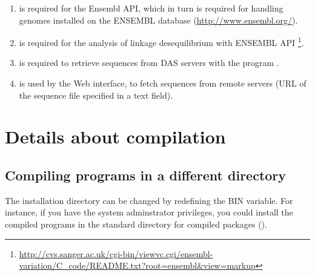 \begin{enumerate}
- for mysql\_config issues, specify the path to mysql\_config (adapt the path to your own installation):
\begin{verbatim}
	cd /Users/yourusername/.cpan/build/DBD-mysql-version-xxxxx
	perl Makefile.pl --mysql_config=/usr/local/mysql/bin/mysql_config 
\end{verbatim}

-then adding a soft link as follows\footnote{\url{http://www.blog.bridgeutopiaweb.com/post/how-to-fix-mysql-load-issues-on-mac-os-x/}}:
\begin{verbatim}
sudo ln -s /usr/local/mysql/lib/libmysqlclient.18.dylib /usr/lib/libmysqlclient.18.dylib
\end{verbatim}
 - finish with 
\begin{verbatim}
make
make test
make install
\end{verbatim}

\item {} is required for the Ensembl API, which in
  turn is required for handling genomes installed on the ENSEMBL
  database (\url{http://www.ensembl.org/}).

\item {} is required for the analysis of linkage
  desequilibrium with ENSEMBL API
  \footnote{\url{http://cvs.sanger.ac.uk/cgi-bin/viewvc.cgi/ensembl-variation/C\_code/README.txt?root=ensembl&view=markup}}.

\item {} is required to retrieve sequences from DAS
  servers with the program .

\item {} is used by the Web interface, to fetch
  sequences from remote servers (URL of the sequence file specified in
  a text field).

\end{enumerate}


\section{Details about \RSAT compilation}

\subsection{Compiling \RSAT programs in a different directory}

The installation directory can be changed by redefining the BIN
variable. For instance, if you have the system adminstrator
privileges, you could install the compiled programs in the standard
directory for compiled packages ().

